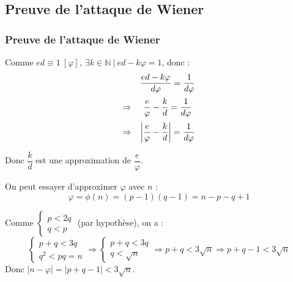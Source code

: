 \documentclass{beamer}
\newcommand{\N}{\mathbb{N}} %
\newcommand{\abs}[1]{\left\lvert #1 \right\rvert}
\begin{document}
    \subsection{Preuve de l'attaque de Wiener}
    \begin{frame}[allowframebreaks]
        \frametitle{Preuve de l'attaque de Wiener}

        Comme $ed \equiv 1\ [\varphi],\ \exists k \in \N\ |\ ed - k\varphi = 1$, donc :
        \[
            \begin{array}{rc}
                & \dfrac{ed - k \varphi}{d\varphi} = \dfrac{1}{d\varphi}
                \vspace{6pt}
                \\
                \Rightarrow&
                \dfrac e \varphi - \dfrac k d = \dfrac 1 {d \varphi}
                \vspace{6pt}
                \\
                \Rightarrow&
                \abs{\dfrac e \varphi - \dfrac k d} = \dfrac 1 {d \varphi}
            \end{array}
        \]
        
        Donc $\dfrac k d$ est une approximation de $\dfrac e \varphi$.
        
        On peut essayer d'approximer $\varphi$ avec $n$ :
        \[
            \varphi = \phi(n) = (p - 1)(q - 1) = n - p - q + 1
        \]
        
        Comme
        $
            \begin{cases}
                p < 2q
                \\
                q < p
            \end{cases}
        $
        (par hypothèse), on a :
        \[
            \begin{cases}
                p + q < 3q
                \\
                q^2 < pq = n
            \end{cases}
            \Rightarrow
            \begin{cases}
                p + q < 3q
                \\
                q < \sqrt n
            \end{cases}
            \Rightarrow
            p + q < 3\sqrt n
            \Rightarrow p + q - 1 < 3\sqrt n
        \]
        Donc $\abs{n - \varphi} = \abs{p + q - 1} < 3\sqrt n$.
        
        \vspace{12pt}
        

\end{frame}
\end{document}
